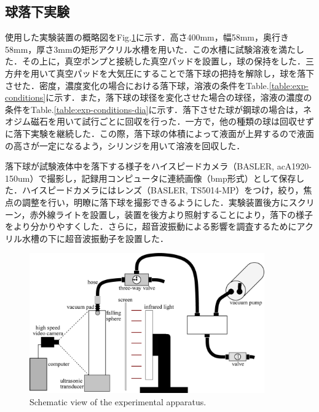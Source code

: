 \newpage

\subsection{球落下実験}

使用した実験装置の概略図をFig.\ref{fig:device}に示す．高さ400mm，幅58mm，奥行き58mm，厚さ3mmの矩形アクリル水槽を用いた．この水槽に試験溶液を満たした．その上に，真空ポンプと接続した真空パッドを設置し，球の保持をした．三方弁を用いて真空パッドを大気圧にすることで落下球の把持を解除し，球を落下させた．密度，濃度変化の場合における落下球，溶液の条件をTable.\ref{table:exp-conditions}に示す．また，落下球の球径を変化させた場合の球径，溶液の濃度の条件をTable.\ref{table:exp-conditions-dia}に示す．落下させた球が鋼球の場合は，ネオジム磁石を用いて試行ごとに回収を行った．一方で，他の種類の球は回収せずに落下実験を継続した．この際，落下球の体積によって液面が上昇するので液面の高さが一定になるよう，シリンジを用いて溶液を回収した．

落下球が試験液体中を落下する様子をハイスピードカメラ（BASLER, acA1920-150um）で撮影し，記録用コンピュータに連続画像（bmp形式）として保存した．ハイスピードカメラにはレンズ（BASLER, TS5014-MP）をつけ，絞り，焦点の調整を行い，明瞭に落下球を撮影できるようにした．実験装置後方にスクリーン，赤外線ライトを設置し，装置を後方より照射することにより，落下の様子をより分かりやすくした．さらに，超音波振動による影響を調査するためにアクリル水槽の下に超音波振動子を設置した．

\begin{figure}[h]
    \centering
    \includegraphics[width=0.9\textwidth]{2-Methods/device-vacuum.eps}
    \caption{Schematic view of the experimental apparatus.}
    \label{fig:device}
\end{figure}


